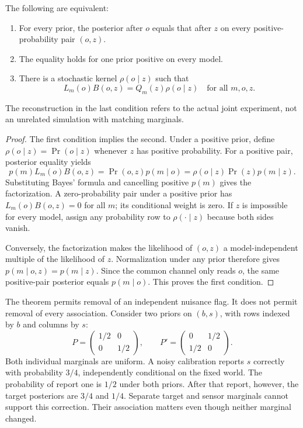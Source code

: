 \begin{theorem}\label{r:bayes}
The following are equivalent:
\begin{enumerate}
\item For every prior, the posterior after $o$ equals that after $z$ on every positive-probability pair $(o,z)$.
\item The equality holds for one prior positive on every model.
\item There is a stochastic kernel $\rho(o\mid z)$ such that
\[
L_m(o)B(o,z)=Q_m(z)\rho(o\mid z)\quad\text{for all }m,o,z.
\]
\end{enumerate}
The reconstruction in the last condition refers to the actual joint experiment, not an unrelated simulation with matching marginals.
\end{theorem}
\begin{proof}
The first condition implies the second. Under a positive prior, define $\rho(o\mid z)=\Pr(o\mid z)$ whenever $z$ has positive probability. For a positive pair, posterior equality yields
\[
p(m)L_m(o)B(o,z)=\Pr(o,z)p(m\mid o)
=\rho(o\mid z)\Pr(z)p(m\mid z).
\]
Substituting Bayes' formula and cancelling positive $p(m)$ gives the factorization. A zero-probability pair under a positive prior has $L_m(o)B(o,z)=0$ for all $m$; its conditional weight is zero. If $z$ is impossible for every model, assign any probability row to $\rho(\cdot\mid z)$ because both sides vanish.

Conversely, the factorization makes the likelihood of $(o,z)$ a model-independent multiple of the likelihood of $z$. Normalization under any prior therefore gives $p(m\mid o,z)=p(m\mid z)$. Since the common channel only reads $o$, the same positive-pair posterior equals $p(m\mid o)$. This proves the first condition.
\end{proof}

The theorem permits removal of an independent nuisance flag. It does not permit removal of every association. Consider two priors on $(b,s)$, with rows indexed by $b$ and columns by $s$:
\[
P=\begin{pmatrix}1/2&0\\0&1/2\end{pmatrix},\qquad
P'=\begin{pmatrix}0&1/2\\1/2&0\end{pmatrix}.
\]
Both individual marginals are uniform. A noisy calibration reports $s$ correctly with probability $3/4$, independently conditional on the fixed world. The probability of report one is $1/2$ under both priors. After that report, however, the target posteriors are $3/4$ and $1/4$. Separate target and sensor marginals cannot support this correction. Their association matters even though neither marginal changed.

